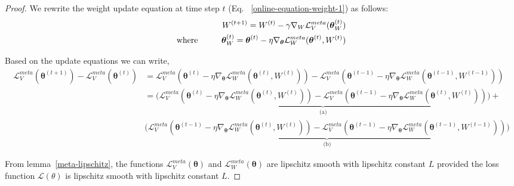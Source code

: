 \begin{proof}
We rewrite the weight update equation at time step $t$ (Eq. ~\ref{online-equation-weight-1}) as follows:
    \begin{align*}
        {W}^{(t+1)} = {W}^{(t)} - \gamma\nabla_{W}\mathcal{L}_{V}^{meta}(\boldsymbol{\theta}^{(t)}_{W})\\
        \text{where\hspace{1cm}}\boldsymbol{\theta}^{(t)}_{W} = \boldsymbol{\theta}^{(t)} - \eta \nabla_{\boldsymbol{\theta}}\mathcal{L}_{W}^{meta}(\boldsymbol{\theta}^{(t)}, W^{(t)})
    \end{align*}
    

Based on the update equations we can write,
\begin{align*}
\mathcal{L}_V^{meta}(\boldsymbol{\theta}^{(t+1)}) - \mathcal{L}_V^{meta}(\boldsymbol{\theta}^{(t)}) &= \mathcal{L}_V^{meta}(\boldsymbol{\theta}^{({t})} - \eta\nabla_{\boldsymbol{\theta}}\mathcal{L}_W^{meta}(\boldsymbol{\theta}^{(t)}, W^{(t)})) - \mathcal{L}_V^{meta}(\boldsymbol{\theta}^{({t-1})} - \eta\nabla_{\boldsymbol{\theta}}\mathcal{L}_W^{meta}(\boldsymbol{\theta}^{(t-1)}, W^{(t-1)}))\\
&= \bigg(\underbrace{\mathcal{L}_V^{meta}(\boldsymbol{\theta}^{(t)} - \eta\nabla_{\boldsymbol{\theta}}\mathcal{L}_W^{meta}(\boldsymbol{\theta}^{(t)}, W^{(t)})) - \mathcal{L}_V^{meta}(\boldsymbol{\theta}^{(t-1)} - \eta\nabla_{\boldsymbol{\theta}}\mathcal{L}_W^{meta}(\boldsymbol{\theta}^{(t)}, W^{(t)}))}_{\text{(a)}}\bigg) +\\
&\bigg(\underbrace{\mathcal{L}_V^{meta}(\boldsymbol{\theta}^{(t-1)} - \eta\nabla_{\boldsymbol{\theta}}\mathcal{L}_W^{meta}(\boldsymbol{\theta}^{(t)}, W^{(t)})) - \mathcal{L}_V^{meta}(\boldsymbol{\theta}^{(t-1)} - \eta\nabla_{\boldsymbol{\theta}}\mathcal{L}_W^{meta}(\boldsymbol{\theta}^{(t-1)}, W^{(t-1)}))}_{\text{(b)}}\bigg)
\end{align*}

From lemma~\ref{meta-lipschitz}, the functions $\mathcal{L}_V^{meta}(\boldsymbol{\theta})$ and $\mathcal{L}_W^{meta}(\boldsymbol{\theta})$ are lipschitz smooth with lipschitz constant $L$ provided the loss function $\mathcal{L}(\theta)$ is lipschitz smooth with lipschitz constant $L$.


\end{proof}
